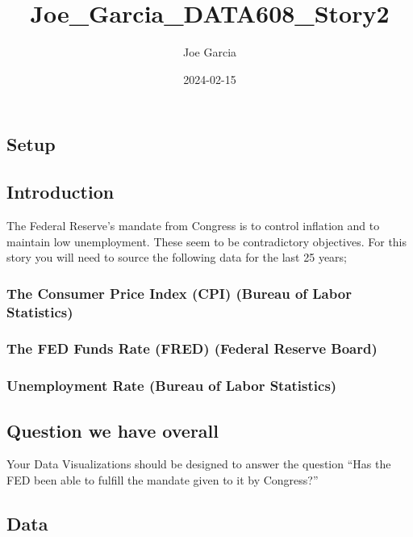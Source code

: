 \documentclass[
]{article}
\title{Joe\_Garcia\_DATA608\_Story2}
\author{Joe Garcia}
\date{2024-02-15}
\begin{document}
\maketitle

\subsection{Setup}\label{setup}

\subsection{Introduction}\label{introduction}

The Federal Reserve's mandate from Congress is to control inflation and
to maintain low unemployment. These seem to be contradictory objectives.
For this story you will need to source the following data for the last
25 years;

\subsubsection{The Consumer Price Index (CPI) (Bureau of Labor
Statistics)}\label{the-consumer-price-index-cpi-bureau-of-labor-statistics}

\subsubsection{The FED Funds Rate (FRED) (Federal Reserve
Board)}\label{the-fed-funds-rate-fred-federal-reserve-board}

\subsubsection{Unemployment Rate (Bureau of Labor
Statistics)}\label{unemployment-rate-bureau-of-labor-statistics}

\subsection{Question we have overall}\label{question-we-have-overall}

Your Data Visualizations should be designed to answer the question ``Has
the FED been able to fulfill the mandate given to it by Congress?''

\subsection{Data}\label{data}
\end{document}
